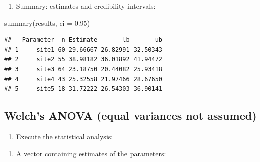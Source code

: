 \documentclass[
]{book}
\newenvironment{Shaded}{\begin{snugshade}}{\end{snugshade}}
\newcommand{\AttributeTok}[1]{\textcolor[rgb]{0.77,0.63,0.00}{#1}}
\newcommand{\CommentTok}[1]{\textcolor[rgb]{0.56,0.35,0.01}{\textit{#1}}}
\newcommand{\DecValTok}[1]{\textcolor[rgb]{0.00,0.00,0.81}{#1}}
\newcommand{\FloatTok}[1]{\textcolor[rgb]{0.00,0.00,0.81}{#1}}
\newcommand{\FunctionTok}[1]{\textcolor[rgb]{0.00,0.00,0.00}{#1}}
\newcommand{\NormalTok}[1]{#1}
\newcommand{\OtherTok}[1]{\textcolor[rgb]{0.56,0.35,0.01}{#1}}
\newcommand{\SpecialCharTok}[1]{\textcolor[rgb]{0.00,0.00,0.00}{#1}}
\providecommand{\tightlist}{%
  \setlength{\itemsep}{0pt}\setlength{\parskip}{0pt}}
\begin{document}
\begin{enumerate}
\def\labelenumi{\arabic{enumi})}
\setcounter{enumi}{5}
\tightlist
\item
  Summary: estimates and credibility intervals:
\end{enumerate}

\begin{Shaded}
\begin{Highlighting}[]
\FunctionTok{summary}\NormalTok{(results, }\AttributeTok{ci =} \FloatTok{0.95}\NormalTok{)}
\end{Highlighting}
\end{Shaded}

\begin{verbatim}
##   Parameter  n Estimate       lb       ub
## 1     site1 60 29.66667 26.82991 32.50343
## 2     site2 55 38.98182 36.01892 41.94472
## 3     site3 64 23.18750 20.44082 25.93418
## 4     site4 43 25.32558 21.97466 28.67650
## 5     site5 18 31.72222 26.54303 36.90141
\end{verbatim}

\hypertarget{welchs-anova-equal-variances-not-assumed}{%
\subsection{Welch's ANOVA (equal variances not assumed)}\label{welchs-anova-equal-variances-not-assumed}}

\begin{enumerate}
\def\labelenumi{\arabic{enumi})}
\tightlist
\item
  Execute the statistical analysis:
\end{enumerate}

\begin{enumerate}
\def\labelenumi{\alph{enumi})}
\tightlist
\item
  A vector containing estimates of the parameters:
\end{enumerate}

\begin{Shaded}
\end{Shaded}
\end{document}
